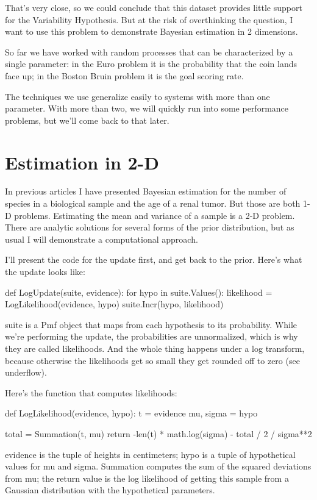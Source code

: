 \documentclass[12pt]{book}
\begin{document}
That's very close, so we could conclude that this dataset provides little
support for the Variability Hypothesis.  But at the risk of overthinking
the question, I want to use this problem to demonstrate Bayesian
estimation in 2 dimensions.

So far we have worked with random processes that can be characterized
by a single parameter: in the Euro problem it is the probability
that the coin lands face up; in the Boston Bruin problem it is the
goal scoring rate.

The techniques we use generalize easily to systems with more than
one parameter.  With more than two, we will quickly run into some
performance problems, but we'll come back to that later.

\section{Estimation in 2-D}

In previous articles I have presented Bayesian estimation for the
number of species in a biological sample and the age of a renal tumor.
But those are both 1-D problems.  Estimating the mean and variance of
a sample is a 2-D problem.  There are analytic solutions for several
forms of the prior distribution, but as usual I will demonstrate a
computational approach.

I'll present the code for the update first, and get back to the prior.
Here's what the update looks like:


def LogUpdate(suite, evidence):
    for hypo in suite.Values():
        likelihood = LogLikelihood(evidence, hypo)
        suite.Incr(hypo, likelihood)

suite is a Pmf object that maps from each hypothesis to its probability.  While we're performing the update, the probabilities are unnormalized, which is why they are called likelihoods.  And the whole thing happens under a log transform, because otherwise the likelihoods get so small they get rounded off to zero (see underflow).


Here's the function that computes likelihoods:


def LogLikelihood(evidence, hypo):
    t = evidence
    mu, sigma = hypo


    total = Summation(t, mu)
    return -len(t) * math.log(sigma) - total / 2 / sigma**2

evidence is the tuple of heights in centimeters; hypo is a tuple of
hypothetical values for mu and sigma.  Summation computes the sum of
the squared deviations from mu; the return value is the log likelihood
of getting this sample from a Gaussian distribution with the
hypothetical parameters.
\end{document}
